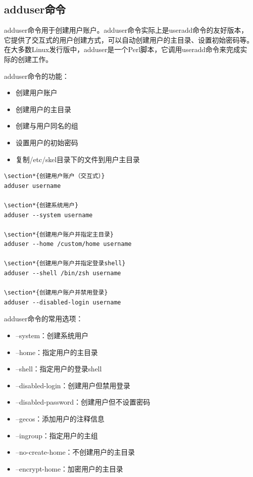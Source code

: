 \documentclass[12pt,UTF8]{ctexbook}
\begin{document}
\subsection{adduser命令}
adduser命令用于创建用户账户。adduser命令实际上是useradd命令的友好版本，它提供了交互式的用户创建方式，可以自动创建用户的主目录、设置初始密码等。在大多数Linux发行版中，adduser是一个Perl脚本，它调用useradd命令来完成实际的创建工作。

adduser命令的功能：
\begin{itemize}
    \item 创建用户账户
    \item 创建用户的主目录
    \item 创建与用户同名的组
    \item 设置用户的初始密码
    \item 复制/etc/skel目录下的文件到用户主目录
\end{itemize}

\begin{verbatim}
\section*{创建用户账户（交互式）}
adduser username

\section*{创建系统用户}
adduser --system username

\section*{创建用户账户并指定主目录}
adduser --home /custom/home username

\section*{创建用户账户并指定登录shell}
adduser --shell /bin/zsh username

\section*{创建用户账户并禁用登录}
adduser --disabled-login username
\end{verbatim}

adduser命令的常用选项：
\begin{itemize}
    \item --system：创建系统用户
    \item --home：指定用户的主目录
    \item --shell：指定用户的登录shell
    \item --disabled-login：创建用户但禁用登录
    \item --disabled-password：创建用户但不设置密码
    \item --gecos：添加用户的注释信息
    \item --ingroup：指定用户的主组
    \item --no-create-home：不创建用户的主目录
    \item --encrypt-home：加密用户的主目录
\end{itemize}
\end{document}
